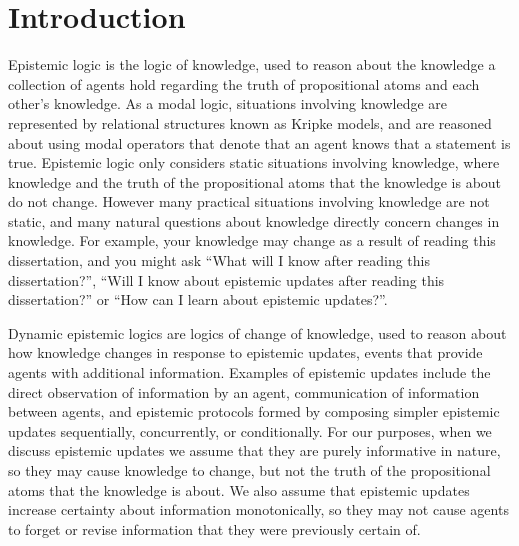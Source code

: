 \chapter{Introduction}\label{introduction}

Epistemic logic is the logic of knowledge, used to reason about the knowledge a collection of agents hold regarding the truth of propositional atoms and each other's knowledge.
As a modal logic, situations involving knowledge are represented by relational structures known as Kripke models, and are reasoned about using modal operators that denote that an agent knows that a statement is true.
Epistemic logic only considers static situations involving knowledge, where knowledge and the truth of the propositional atoms that the knowledge is about do not change.
However many practical situations involving knowledge are not static, and many natural questions about knowledge directly concern changes in knowledge.
For example, your knowledge may change as a result of reading this dissertation, and you might ask ``What will I know after reading this dissertation?'', ``Will I know about epistemic updates after reading this dissertation?'' or ``How can I learn about epistemic updates?''.

Dynamic epistemic logics are logics of change of knowledge, used to reason about how knowledge changes in response to epistemic updates, events that provide agents with additional information.
Examples of epistemic updates include the direct observation of information by an agent, communication of information between agents, and epistemic protocols formed by composing simpler epistemic updates sequentially, concurrently, or conditionally.
For our purposes, when we discuss epistemic updates we assume that they are purely informative in nature, so they may cause knowledge to change, but not the truth of the propositional atoms that the knowledge is about.
We also assume that epistemic updates increase certainty about information monotonically, so they may not cause agents to forget or revise information that they were previously certain of. 

